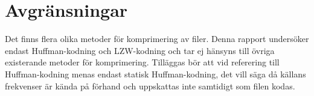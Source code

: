 \section{Avgränsningar}
\label{sec:delimitations}

Det finns flera olika metoder för komprimering av filer. Denna rapport undersöker endast Huffman-kodning och LZW-kodning och tar ej hänsyns till övriga existerande metoder för komprimering. Tilläggas bör att vid referering till Huffman-kodning menas endast statisk Huffman-kodning, det vill säga då källans frekvenser är kända på förhand och uppskattas inte samtidigt som filen kodas.




